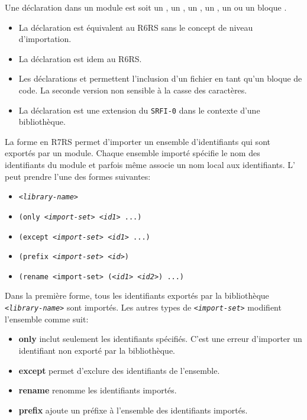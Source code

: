 Une déclaration dans un module est soit un , un ,
un , un , un  ou un
bloque .
\begin{itemize}
  \item La déclaration  est équivalent au R6RS sans le concept
    de niveau d'importation.

  \item La déclaration  est idem au R6RS.

  \item Les déclarations  et  permettent
    l'inclusion d'un fichier en tant qu'un bloque de code.  La seconde version
    non sensible à la casse des caractères.

  \item La déclaration  est une extension du \texttt{SRFI-0}
    dans le contexte d'une bibliothèque.

\end{itemize}

La forme  en R7RS permet d'importer un ensemble d'identifiants
qui sont exportés par un module. Chaque ensemble importé spécifie le nom des
identifiants du module et parfois même associe un nom local aux identifiants.
L' peut prendre l'une des formes suivantes:
\begin{itemize}
  \label{itm:import-set}
  \item \texttt{\textit{<library-name>}}
  \item \texttt{(only \textit{<import-set>} \textit{<id1>} ...)}
  \item \texttt{(except \textit{<import-set>} \textit{<id1>} ...)}
  \item \texttt{(prefix \textit{<import-set>} \textit{<id>})}
  \item \texttt{(rename <import-set> (\textit{<id1>} \textit{<id2>}) ...)}
\end{itemize}


Dans la première forme, tous les identifiants exportés par
la bibliothèque \texttt{\textit{<library-name>}} sont importés.
Les autres types de \texttt{\textit{<import-set>}} modifient
l'ensemble comme suit:
\begin{itemize}
  \item \textbf{only} inclut seulement les identifiants spécifiés. C'est une
    erreur d'importer un identifiant non exporté par la bibliothèque.

  \item \textbf{except} permet d'exclure des identifiants de l'ensemble.

  \item \textbf{rename} renomme les identifiants importés.

  \item \textbf{prefix} ajoute un préfixe à l'ensemble des identifiants
    importés.
\end{itemize}

